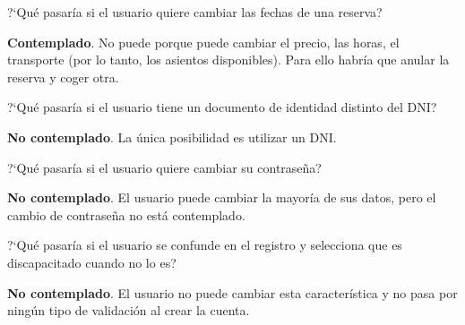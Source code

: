 \begin{escenario} %
  \centering
?`Qué pasaría si el usuario quiere cambiar las fechas de una reserva?

\begin{solucion}
  \centering
  \textbf{Contemplado}. No puede porque puede cambiar el precio, las horas, el transporte (por lo tanto, los asientos disponibles). Para ello habría que anular la reserva y coger otra.
\end{solucion}
\end{escenario}

\begin{escenario} %
    \centering
  ?`Qué pasaría si el usuario tiene un documento de identidad distinto del DNI?
  
\begin{solucion}
    \centering
    \textbf{No contemplado}. La única posibilidad es utilizar un DNI.
\end{solucion}
\end{escenario}

\begin{escenario} %
    \centering
  ?`Qué pasaría si el usuario quiere cambiar su contraseña?
  
\begin{solucion}
    \centering
    \textbf{No contemplado}. El usuario puede cambiar la mayoría de sus datos, pero el cambio de contraseña no está contemplado.
\end{solucion}
\end{escenario}

\begin{escenario} %
    \centering
  ?`Qué pasaría si el usuario se confunde en el registro y selecciona que es discapacitado cuando no lo es?
  
\begin{solucion}
    \centering
    \textbf{No contemplado}. El usuario no puede cambiar esta característica y no pasa por ningún tipo de validación al crear la cuenta.
\end{solucion}
\end{escenario}